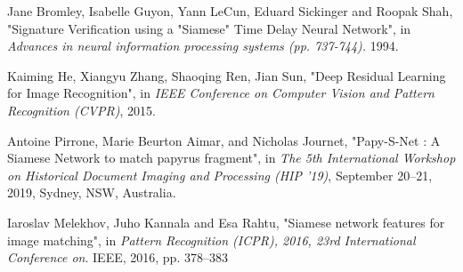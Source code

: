 \documentclass[11pt]{report}
\begin{document}
\newpage


\begin{thebibliography}{9}
    
    Jane Bromley, Isabelle Guyon, Yann LeCun, Eduard Sickinger and Roopak Shah,
    "Signature Verification using a "Siamese" Time Delay Neural Network",
    in \emph{Advances in neural information processing systems (pp. 737-744).} 1994.
    
    Kaiming He, Xiangyu Zhang, Shaoqing Ren, Jian Sun,
    "Deep Residual Learning for Image Recognition",
    in \emph{IEEE Conference on Computer Vision and Pattern Recognition (CVPR)}, 2015.

    Antoine Pirrone, Marie Beurton Aimar, and Nicholas Journet,
    "Papy-S-Net : A Siamese Network to match papyrus fragment",
    in \emph{The 5th International Workshop on Historical Document Imaging and Processing (HIP ’19)}, September 20–21, 2019, Sydney, NSW, Australia.
      
    Iaroslav Melekhov, Juho Kannala and Esa Rahtu,
    "Siamese  network  features  for image  matching",
    in \emph{Pattern  Recognition (ICPR), 2016, 23rd International Conference on}. IEEE, 2016, pp. 378–383

      
      
\end{thebibliography}
\end{document}
